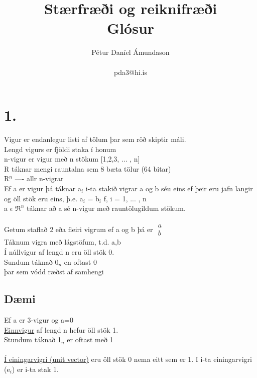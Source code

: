 \documentclass[]{article}
\begin{document}
\title{Stærfræði og reiknifræði \\
	Glósur}
\author{Pétur Daníel Ámundason \\ \\ pda3@hi.is}
\maketitle

\section*{1.}


Vigur er endanlegur listi af tölum þar sem röð skiptir máli.\\
Lengd vigurs er fjöldi staka í honum \\
n-vigur er vigur með n stökum [1,2,3, ... , n] \\
R táknar mengi rauntalna sem 8 bæta tölur (64 bitar) \\
R$ ^{n} $ ---- allr n-vigrar \\
Ef a er vigur þá táknar a$_{i}$ i-ta stakið vigrar a og b séu eins ef þeir eru jafn langir og öll stök eru eins, þ.e. a$ _{i} $ = b$ _{i} $ f, i = 1, ... , n\\
a $\epsilon$ $\Re^{n}$ táknar að a sé n-vigur með rauntölugildum stökum.
\\
\\
Getum staflað 2 eða fleiri vigrum ef a og b þá er $\begin{array}{|c|} 
	a \\ b
\end{array}
$
\\

Táknum vigra með lágstöfum, t.d. a,b\\
Í núllvigur af lengd n eru öll stök 0.\\
Sundum táknað $ 0_{n} $ en oftast 0\\
þar sem vódd ræðst af samhengi\\

\subsection*{Dæmi}
Ef a er 3-vigur og a=0 \\
\underline{Einnvigur} af lengd n hefur öll stök 1.\\
Stundum táknað 1$ _{n} $ er oftast með 1 \\
\\
\underline{Í einingarvigri (unit vector)} eru öll stök 0 nema eitt sem er 1. I i-ta einingarvigri (e$_{i}  $) er i-ta stak 1.
\end{document}
